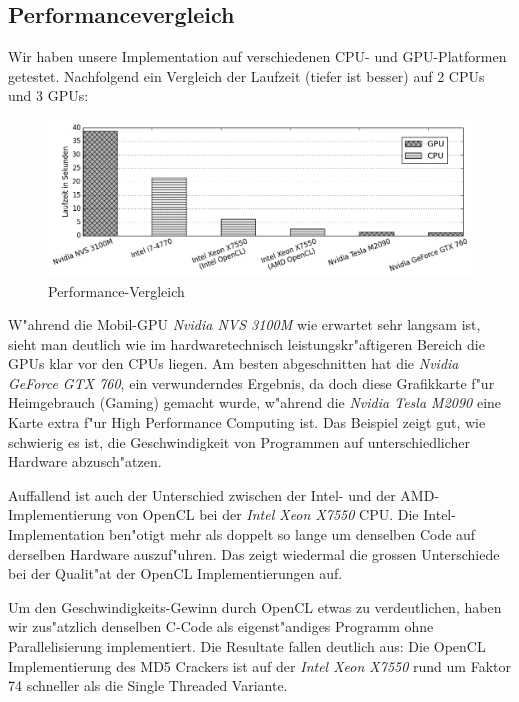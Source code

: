 \begin{refsection}
\subsection{Performancevergleich}

Wir haben unsere Implementation auf verschiedenen CPU- und GPU-Platformen
getestet. Nachfolgend ein Vergleich der Laufzeit (tiefer ist besser) auf 2 CPUs
und 3 GPUs:

\begin{figure}[H]
	\centering
	\includegraphics[width=.9\textwidth]{crypto/graphs/speed_comparison_v1.png}
	\caption{Performance-Vergleich}
	\label{img:crypto:speed_comparison_v1}
\end{figure}

W"ahrend die Mobil-GPU \textit{Nvidia NVS 3100M} wie erwartet sehr
langsam ist, sieht man deutlich wie im hardwaretechnisch leistungskr"aftigeren
Bereich die GPUs klar vor den CPUs liegen. Am besten abgeschnitten hat die
\textit{Nvidia GeForce GTX 760}, ein verwunderndes Ergebnis, da doch diese
Grafikkarte f"ur Heimgebrauch (Gaming) gemacht wurde, w"ahrend die
\textit{Nvidia Tesla M2090} eine Karte extra f"ur High Performance Computing
ist. Das Beispiel zeigt gut, wie schwierig es ist, die Geschwindigkeit von
Programmen auf unterschiedlicher Hardware abzusch"atzen.

Auffallend ist auch der Unterschied zwischen der Intel- und der
AMD-Implementierung von OpenCL bei der \textit{Intel Xeon X7550} CPU. Die
Intel-Implementation ben"otigt mehr als doppelt so lange um denselben Code auf
derselben Hardware auszuf"uhren. Das zeigt wiedermal die grossen Unterschiede
bei der Qualit"at der OpenCL Implementierungen auf.

Um den Geschwindigkeits-Gewinn durch OpenCL etwas zu verdeutlichen, haben wir
zus"atzlich denselben C-Code als eigenst"andiges Programm ohne Parallelisierung
implementiert. Die Resultate fallen deutlich aus: Die OpenCL Implementierung des
MD5 Crackers ist auf der \textit{Intel Xeon X7550} rund um Faktor 74 schneller
als die Single Threaded Variante.


\end{refsection}
